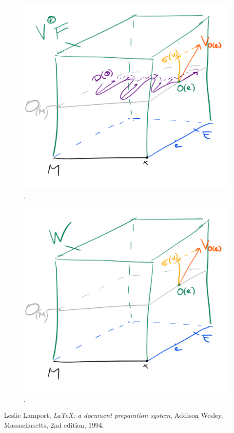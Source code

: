\documentclass[a4paper,12pt]{scrartcl}  %
\begin{document}
\begin{figure}
  \centering
  \includegraphics{Pictures/fieldJacobi.png}
  \caption{.}
\end{figure}

\begin{figure}
  \centering
  \includegraphics{Pictures/sigma.png}
  \caption{.}
\end{figure}





\begin{thebibliography}{9}

  Leslie Lamport,
  \emph{\LaTeX: a document preparation system},
  Addison Wesley, Massachusetts,
  2nd edition,
  1994.

\end{thebibliography}
\end{document}

